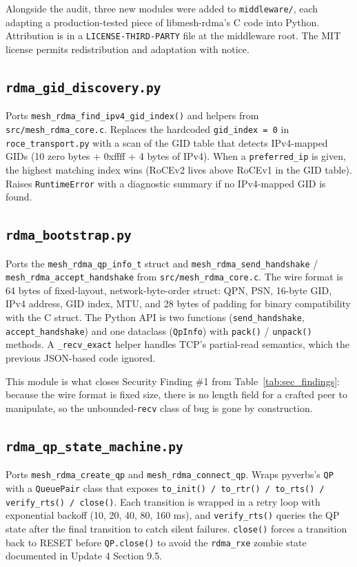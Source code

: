 \documentclass[11pt]{article}
\begin{document}
Alongside the audit, three new modules were added to
\texttt{middleware/}, each adapting a production-tested piece of
libmesh-rdma's C code into Python. Attribution is in a
\texttt{LICENSE-THIRD-PARTY} file at the middleware root. The MIT
license permits redistribution and adaptation with notice.

\subsection{\texttt{rdma\_gid\_discovery.py}}

Ports \texttt{mesh\_rdma\_find\_ipv4\_gid\_index()} and helpers from
\texttt{src/mesh\_rdma\_core.c}. Replaces the hardcoded
\texttt{gid\_index = 0} in \texttt{roce\_transport.py} with a scan of
the GID table that detects IPv4-mapped GIDs (10 zero bytes + 0xffff +
4 bytes of IPv4). When a \texttt{preferred\_ip} is given, the highest
matching index wins (RoCEv2 lives above RoCEv1 in the GID table).
Raises \texttt{RuntimeError} with a diagnostic summary if no
IPv4-mapped GID is found.

\subsection{\texttt{rdma\_bootstrap.py}}

Ports the \texttt{mesh\_rdma\_qp\_info\_t} struct and
\texttt{mesh\_rdma\_send\_handshake} / \texttt{mesh\_rdma\_accept\_handshake}
from \texttt{src/mesh\_rdma\_core.c}. The wire format is 64 bytes of
fixed-layout, network-byte-order struct: QPN, PSN, 16-byte GID, IPv4
address, GID index, MTU, and 28 bytes of padding for binary
compatibility with the C struct. The Python API is two functions
(\texttt{send\_handshake}, \texttt{accept\_handshake}) and one
dataclass (\texttt{QpInfo}) with \texttt{pack()} / \texttt{unpack()}
methods. A \texttt{\_recv\_exact} helper handles TCP's partial-read
semantics, which the previous JSON-based code ignored.

This module is what closes Security Finding \#1 from
Table~\ref{tab:sec_findings}: because the wire format is fixed size,
there is no length field for a crafted peer to manipulate, so the
unbounded-\texttt{recv} class of bug is gone by construction.

\subsection{\texttt{rdma\_qp\_state\_machine.py}}

Ports \texttt{mesh\_rdma\_create\_qp} and
\texttt{mesh\_rdma\_connect\_qp}. Wraps pyverbs's \texttt{QP} with a
\texttt{QueuePair} class that exposes
\texttt{to\_init() / to\_rtr() / to\_rts() / verify\_rts() / close()}.
Each transition is wrapped in a retry loop with exponential backoff
(10, 20, 40, 80, 160 ms), and \texttt{verify\_rts()} queries the QP
state after the final transition to catch silent failures.
\texttt{close()} forces a transition back to RESET before
\texttt{QP.close()} to avoid the \texttt{rdma\_rxe} zombie state
documented in Update 4 Section 9.5.
\end{document}
